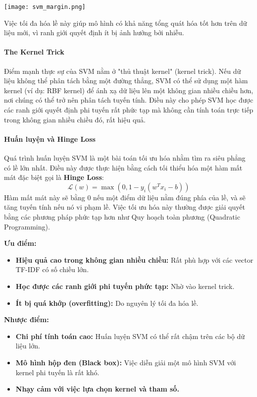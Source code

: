 \begin{center}
    \texttt{[image: svm\_margin.png]}
    \label{fig:svm_margin}
\end{center}

Việc tối đa hóa lề này giúp mô hình có khả năng tổng quát hóa tốt hơn trên dữ liệu mới, vì ranh giới quyết định ít bị ảnh hưởng bởi nhiễu.

\paragraph{The Kernel Trick}
Điểm mạnh thực sự của SVM nằm ở "thủ thuật kernel" (kernel trick). Nếu dữ liệu không thể phân tách bằng một đường thẳng, SVM có thể sử dụng một hàm kernel (ví dụ: RBF kernel) để ánh xạ dữ liệu lên một không gian nhiều chiều hơn, nơi chúng có thể trở nên phân tách tuyến tính. Điều này cho phép SVM học được các ranh giới quyết định phi tuyến rất phức tạp mà không cần tính toán trực tiếp trong không gian nhiều chiều đó, rất hiệu quả.

\paragraph{Huấn luyện và Hinge Loss}
Quá trình huấn luyện SVM là một bài toán tối ưu hóa nhằm tìm ra siêu phẳng có lề lớn nhất. Điều này được thực hiện bằng cách tối thiểu hóa một hàm mất mát đặc biệt gọi là \textbf{Hinge Loss}:
$$ \mathcal{L}(w) = \max(0, 1 - y_i(w^T x_i - b)) $$
Hàm mất mát này sẽ bằng 0 nếu một điểm dữ liệu nằm đúng phía của lề, và sẽ tăng tuyến tính nếu nó vi phạm lề. Việc tối ưu hóa này thường được giải quyết bằng các phương pháp phức tạp hơn như Quy hoạch toàn phương (Quadratic Programming).

\begin{tcolorbox}[
    title=Đánh giá SVM,
    colback=blue!5!white, colframe=blue!50!black, fonttitle=\bfseries
]
\textbf{Ưu điểm:}
\begin{itemize}
    \item \textbf{Hiệu quả cao trong không gian nhiều chiều:} Rất phù hợp với các vector TF-IDF có số chiều lớn.
    \item \textbf{Học được các ranh giới phi tuyến phức tạp:} Nhờ vào kernel trick.
    \item \textbf{Ít bị quá khớp (overfitting):} Do nguyên lý tối đa hóa lề.
\end{itemize}
\textbf{Nhược điểm:}
\begin{itemize}
    \item \textbf{Chi phí tính toán cao:} Huấn luyện SVM có thể rất chậm trên các bộ dữ liệu lớn.
    \item \textbf{Mô hình hộp đen (Black box):} Việc diễn giải một mô hình SVM với kernel phi tuyến là rất khó.
    \item \textbf{Nhạy cảm với việc lựa chọn kernel và tham số.}
\end{itemize}
\end{tcolorbox}


